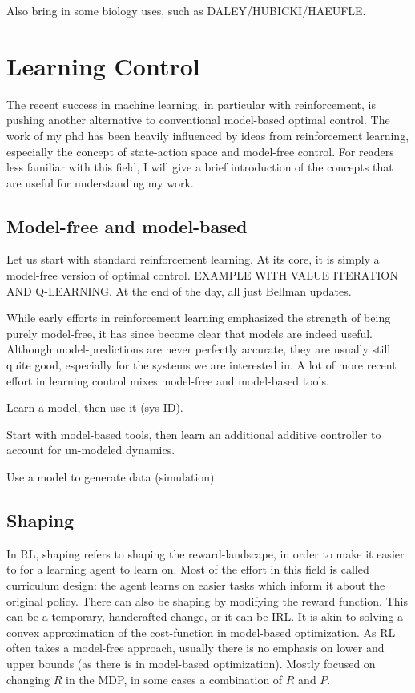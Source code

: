 Also bring in some biology uses, such as DALEY/HUBICKI/HAEUFLE.

\section{Learning Control}

The recent success in machine learning, in particular with reinforcement, is pushing another alternative to conventional model-based optimal control. The work of my phd has been heavily influenced by ideas from reinforcement learning, especially the concept of state-action space and model-free control. For readers less familiar with this field, I will give a brief introduction of the concepts that are useful for understanding my work.

\subsection{Model-free and model-based}
Let us start with standard reinforcement learning. At its core, it is simply a model-free version of optimal control. EXAMPLE WITH VALUE ITERATION AND Q-LEARNING.
At the end of the day, all just Bellman updates. \par

While early efforts in reinforcement learning emphasized the strength of being purely model-free, it has since become clear that models are indeed useful. Although model-predictions are never perfectly accurate, they are usually still quite good, especially for the systems we are interested in. A lot of more recent effort in learning control mixes model-free and model-based tools. \par

Learn a model, then use it (sys ID).

Start with model-based tools, then learn an additional additive controller to account for un-modeled dynamics.

Use a model to generate data (simulation).

\subsection{Shaping}

In RL, shaping refers to shaping the reward-landscape, in order to make it easier to for a learning agent to learn on.
Most of the effort in this field is called curriculum design: the agent learns on easier tasks which inform it about the original policy.
There can also be shaping by modifying the reward function. This can be a temporary, handcrafted change, or it can be IRL.
It is akin to solving a convex approximation of the cost-function in model-based optimization. As RL often takes a model-free approach, usually there is no emphasis on lower and upper bounds (as there is in model-based optimization).
Mostly focused on changing $R$ in the MDP, in some cases a combination of $R$ and $P$.

